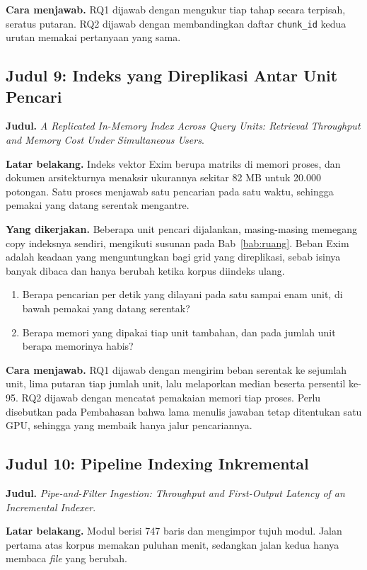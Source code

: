 \textbf{Cara menjawab.} RQ1 dijawab dengan mengukur tiap tahap secara
terpisah, seratus putaran. RQ2 dijawab dengan membandingkan daftar
\texttt{chunk\_id} kedua urutan memakai pertanyaan yang sama.

\subsection*{Judul 9: Indeks yang Direplikasi Antar Unit Pencari}

\textbf{Judul.} \textit{A Replicated In-Memory Index Across Query Units:
Retrieval Throughput and Memory Cost Under Simultaneous Users}.

\textbf{Latar belakang.} Indeks vektor Exim berupa matriks di memori proses,
dan dokumen arsitekturnya menaksir ukurannya sekitar 82 MB untuk 20.000
potongan. Satu proses menjawab satu pencarian pada satu waktu, sehingga
pemakai yang datang serentak mengantre.

\textbf{Yang dikerjakan.} Beberapa unit pencari dijalankan, masing-masing
memegang copy indeksnya sendiri, mengikuti susunan pada
Bab~\ref{bab:ruang}. Beban Exim adalah keadaan yang menguntungkan bagi grid
yang direplikasi, sebab isinya banyak dibaca dan hanya berubah ketika korpus
diindeks ulang.

\begin{enumerate}
  \item Berapa pencarian per detik yang dilayani pada satu sampai enam unit,
    di bawah pemakai yang datang serentak?
  \item Berapa memori yang dipakai tiap unit tambahan, dan pada jumlah unit
    berapa memorinya habis?
\end{enumerate}

\textbf{Cara menjawab.} RQ1 dijawab dengan mengirim beban serentak ke
sejumlah unit, lima putaran tiap jumlah unit, lalu melaporkan median beserta
persentil ke-95. RQ2 dijawab dengan mencatat pemakaian memori tiap proses.
Perlu disebutkan pada Pembahasan bahwa lama menulis jawaban tetap ditentukan
satu GPU, sehingga yang membaik hanya jalur pencariannya.

\subsection*{Judul 10: Pipeline Indexing Inkremental}

\textbf{Judul.} \textit{Pipe-and-Filter Ingestion: Throughput and First-Output Latency of an Incremental Indexer}.

\textbf{Latar belakang.} Modul  berisi 747 baris dan
mengimpor tujuh modul. Jalan pertama atas korpus memakan puluhan menit,
sedangkan jalan kedua hanya membaca \textit{file} yang berubah.

